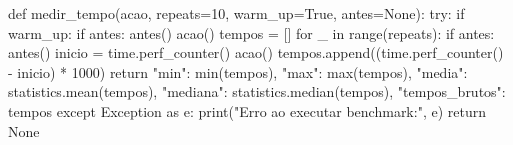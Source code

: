 
\begin{codigo}[language=Python, breaklines=true, caption={Função de medição de tempo.}, label={lst:medir-tempo}]
def medir_tempo(acao, repeats=10, warm_up=True, antes=None):
    try:
        if warm_up:
            if antes:
                antes()
            acao()
        tempos = []
        for _ in range(repeats):
            if antes:
                antes()
            inicio = time.perf_counter()
            acao()
            tempos.append((time.perf_counter() - inicio) * 1000)
        return {"min": min(tempos), "max": max(tempos),
                "media": statistics.mean(tempos),
                "mediana": statistics.median(tempos),
                "tempos_brutos": tempos}
    except Exception as e:
        print("Erro ao executar benchmark:", e)
        return None
\end{codigo}
